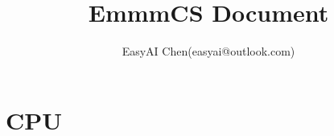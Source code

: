 \documentclass[10pt,fancyhdr,UTF8]{ctexbook}
\title{EmmmCS Document}
\author{EasyAI Chen(easyai@outlook.com)}
\begin{document}
\begin{sloppypar}
\maketitle
\tableofcontents
\mainmatter
\part{CPU}


\end{sloppypar}
\end{document}
